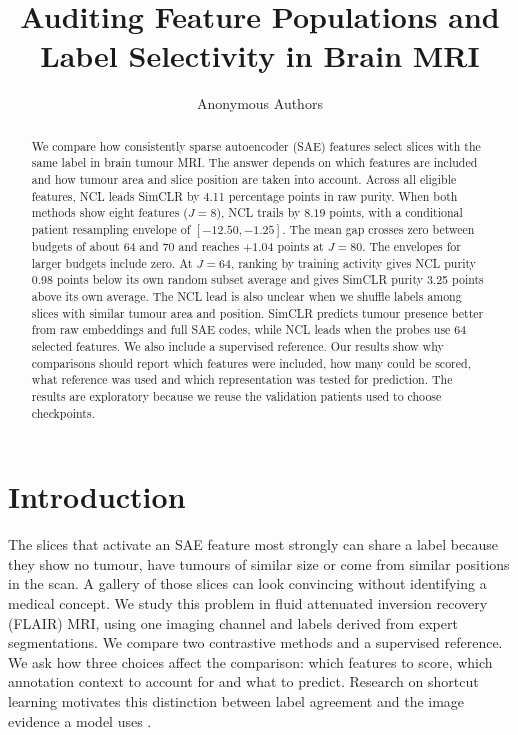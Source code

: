 \documentclass[letterpaper]{article}
\title{Auditing Feature Populations and Label Selectivity in Brain MRI}
\author{Anonymous Authors}
\begin{document}
\setlength{\parindent}{0pt}
\setlength{\parskip}{2pt}
\maketitle
\begin{abstract}
We compare how consistently sparse autoencoder (SAE) features select slices with the same label in brain tumour MRI. The answer depends on which features are included and how tumour area and slice position are taken into account. Across all eligible features, NCL leads SimCLR by 4.11 percentage points in raw purity. When both methods show eight features ($J=8$), NCL trails by $8.19$ points, with a conditional patient resampling envelope of $[-12.50,-1.25]$. The mean gap crosses zero between budgets of about 64 and 70 and reaches $+1.04$ points at $J=80$. The envelopes for larger budgets include zero. At $J=64$, ranking by training activity gives NCL purity 0.98 points below its own random subset average and gives SimCLR purity 3.25 points above its own average. The NCL lead is also unclear when we shuffle labels among slices with similar tumour area and position. SimCLR predicts tumour presence better from raw embeddings and full SAE codes, while NCL leads when the probes use 64 selected features. We also include a supervised reference. Our results show why comparisons should report which features were included, how many could be scored, what reference was used and which representation was tested for prediction. The results are exploratory because we reuse the validation patients used to choose checkpoints.
\end{abstract}

\section{Introduction}
The slices that activate an SAE feature most strongly can share a label because they show no tumour, have tumours of similar size or come from similar positions in the scan. A gallery of those slices can look convincing without identifying a medical concept. We study this problem in fluid attenuated inversion recovery (FLAIR) MRI, using one imaging channel and labels derived from expert segmentations. We compare two contrastive methods and a supervised reference. We ask how three choices affect the comparison: which features to score, which annotation context to account for and what to predict. Research on shortcut learning motivates this distinction between label agreement and the image evidence a model uses \cite{geirhos2020shortcut}.
\end{document}
